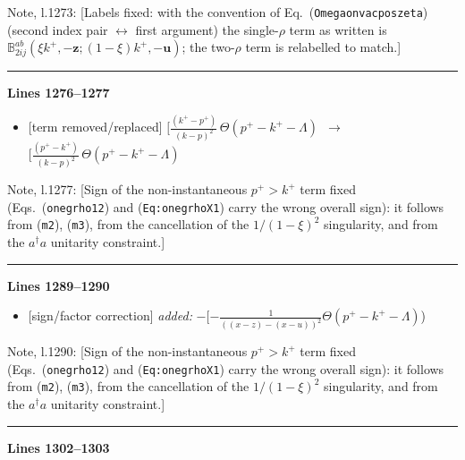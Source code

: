 \documentclass[10pt]{article}
\newenvironment{notebox}{\def\FrameCommand{{\color{notebar}\vrule width 1.5pt}\hspace{6pt}}\MakeFramed{\advance\hsize-\width\FrameRestore}\small}{\endMakeFramed}
\def\mf#1{\mathbb{#1}}
\def\v#1{\mathbf{#1}}
\begin{document}
\begin{notebox}\textsf{\small Note, l.1273:} [Labels fixed: with the convention of Eq.~(\texttt{Omegaonvacposzeta}) (second index pair $\leftrightarrow$ first argument) the single-$\rho$ term as written is $\mf{B}^{ab}_{2ij}(\xi k^+,-\v{z};(1-\xi)k^+,-\v{u})$; the two-$\rho$ term is relabelled to match.]\end{notebox}
\noindent\rule{\linewidth}{0.3pt}\par\noindent\textbf{Lines 1276--1277} \par
\begin{itemize}[leftmargin=2.2em,itemsep=1pt,topsep=2pt]
\item[\textbf{l.1276}] \textsf{\small [term removed/replaced]} $\displaystyle [\frac{(k^{+}-p^{+})}{(k-p)^{2}}\,\Theta(p^{+}-k^{+}-\Lambda)$\ $\longrightarrow$\ $\displaystyle [\frac{(p^{+}-k^{+})}{(k-p)^{2}}\,\Theta(p^{+}-k^{+}-\Lambda)$
\end{itemize}
\begin{notebox}\textsf{\small Note, l.1277:} [Sign of the non-instantaneous $p^+>k^+$ term fixed (Eqs.~(\texttt{onegrho12}) and (\texttt{Eq:onegrhoX1}) carry the wrong overall sign): it follows from (\texttt{m2}), (\texttt{m3}), from the cancellation of the $1/(1-\xi)^2$ singularity, and from the $a^\dagger a$ unitarity constraint.]\end{notebox}
\noindent\rule{\linewidth}{0.3pt}\par\noindent\textbf{Lines 1289--1290} \par
\begin{itemize}[leftmargin=2.2em,itemsep=1pt,topsep=2pt]
\item[\textbf{l.1289}] \textsf{\small [sign/factor correction]} \emph{added:} $\displaystyle -$$\displaystyle [-\frac{1}{((x-z) - (x-u))^2}\Theta(p^{+} - k^{+} - \Lambda )${\color{gray}\small)}
\end{itemize}
\begin{notebox}\textsf{\small Note, l.1290:} [Sign of the non-instantaneous $p^+>k^+$ term fixed (Eqs.~(\texttt{onegrho12}) and (\texttt{Eq:onegrhoX1}) carry the wrong overall sign): it follows from (\texttt{m2}), (\texttt{m3}), from the cancellation of the $1/(1-\xi)^2$ singularity, and from the $a^\dagger a$ unitarity constraint.]\end{notebox}
\noindent\rule{\linewidth}{0.3pt}\par\noindent\textbf{Lines 1302--1303} \par
\end{document}
